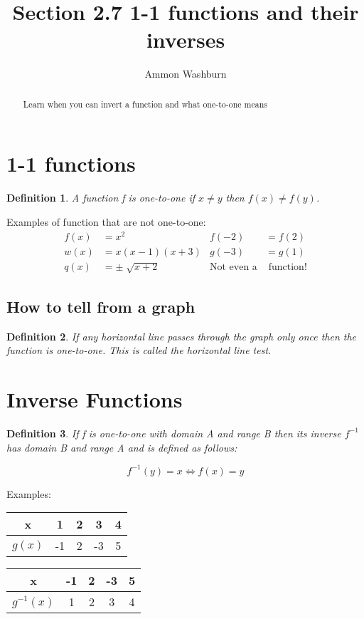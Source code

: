 \documentclass{tufte-handout}
\title{Section 2.7 1-1 functions and their inverses}
\author[AW]{Ammon Washburn}
\newtheorem{mydef}{Definition}
\begin{document}
\maketitle

\begin{abstract}
Learn when you can invert a function and what one-to-one means
\end{abstract}

\section{1-1 functions}
\begin{mydef}
A function f is one-to-one if $x \neq y$ then $f(x) \neq f(y)$.
\end{mydef}
Examples of function that are not one-to-one:
\begin{align}
f(x) & = x^2 & f(-2) & = f(2)\\
w(x) & = x(x-1)(x+3) & g(-3) & = g(1) \\
q(x) & = \pm \sqrt[]{x+2} & \textrm{Not even a} & \textrm{ function!}
\end{align}

\subsection{How to tell from a graph}
\begin{mydef}
If any horizontal line passes through the graph only once then the function is one-to-one.  This is called the horizontal line test.
\end{mydef}

\section{Inverse Functions}
\begin{mydef}
If f is one-to-one with domain A and range B then its inverse $f^{-1}$ has domain B and range A and is defined as follows:
\end{mydef}
\[f^{-1}(y) = x \Leftrightarrow f(x) = y\]

\noindent Examples:

\begin{table}
\centering
\begin{tabular}{c || c | c | c | c}
x & 1 & 2 & 3 & 4 \\
\hline
$g(x)$ & -1 & 2 & -3 & 5
\end{tabular}
\quad
\begin{tabular}{c || c | c | c | c}
x & -1 & 2 & -3 & 5 \\
\hline
$g^{-1}(x)$ & 1 & 2 & 3 & 4
\end{tabular}
\end{table}
\end{document}

